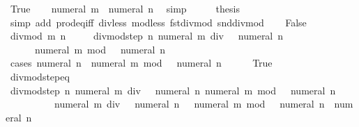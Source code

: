 \begin{isabellebody}
\ True\ \isamarkupfalse%
\ \isamarkupfalse%
\ {\isachardoublequoteopen}numeral\ m\ {\isacharless}{\kern0pt}\ numeral\ n{\isachardoublequoteclose}\ \isamarkupfalse%
\ simp\isanewline
\ \ \isamarkupfalse%
\ \isamarkupfalse%
\ {\isacharquery}{\kern0pt}thesis\isanewline
\ \ \ \ \isamarkupfalse%
\ {\isacharparenleft}{\kern0pt}simp\ add{\isacharcolon}{\kern0pt}\ prod{\isacharunderscore}{\kern0pt}eq{\isacharunderscore}{\kern0pt}iff\ div{\isacharunderscore}{\kern0pt}less\ mod{\isacharunderscore}{\kern0pt}less\ fst{\isacharunderscore}{\kern0pt}divmod\ snd{\isacharunderscore}{\kern0pt}divmod{\isacharparenright}{\kern0pt}\isanewline
{}\isamarkupfalse%
\isanewline
\ \ \isamarkupfalse%
\ False\isanewline
\ \ \isamarkupfalse%
\ {\isachardoublequoteopen}divmod\ m\ n\ {\isacharequal}{\kern0pt}\isanewline
\ \ \ \ divmod{\isacharunderscore}{\kern0pt}step\ n\ {\isacharparenleft}{\kern0pt}numeral\ m\ div\ {\isacharparenleft}{\kern0pt}{}\ {\isacharasterisk}{\kern0pt}\ numeral\ n{\isacharparenright}{\kern0pt}{\isacharcomma}{\kern0pt}\isanewline
\ \ \ \ \ \ numeral\ m\ mod\ {\isacharparenleft}{\kern0pt}{}\ {\isacharasterisk}{\kern0pt}\ numeral\ n{\isacharparenright}{\kern0pt}{\isacharparenright}{\kern0pt}{\isachardoublequoteclose}\isanewline
\ \ \isamarkupfalse%
\ {\isacharparenleft}{\kern0pt}cases\ {\isachardoublequoteopen}numeral\ n\ {\isasymle}\ numeral\ m\ mod\ {\isacharparenleft}{\kern0pt}{}\ {\isacharasterisk}{\kern0pt}\ numeral\ n{\isacharparenright}{\kern0pt}{\isachardoublequoteclose}{\isacharparenright}{\kern0pt}\isanewline
\ \ \ \ \isamarkupfalse%
\ True\isanewline
\ \ \ \ \isamarkupfalse%
\ divmod{\isacharunderscore}{\kern0pt}step{\isacharunderscore}{\kern0pt}eq\isanewline
\ \ \ \ \ \ \isamarkupfalse%
\ {\isachardoublequoteopen}divmod{\isacharunderscore}{\kern0pt}step\ n\ {\isacharparenleft}{\kern0pt}numeral\ m\ div\ {\isacharparenleft}{\kern0pt}{}\ {\isacharasterisk}{\kern0pt}\ numeral\ n{\isacharparenright}{\kern0pt}{\isacharcomma}{\kern0pt}\ numeral\ m\ mod\ {\isacharparenleft}{\kern0pt}{}\ {\isacharasterisk}{\kern0pt}\ numeral\ n{\isacharparenright}{\kern0pt}{\isacharparenright}{\kern0pt}\ {\isacharequal}{\kern0pt}\isanewline
\ \ \ \ \ \ \ \ {\isacharparenleft}{\kern0pt}{}\ {\isacharasterisk}{\kern0pt}\ {\isacharparenleft}{\kern0pt}numeral\ m\ div\ {\isacharparenleft}{\kern0pt}{}\ {\isacharasterisk}{\kern0pt}\ numeral\ n{\isacharparenright}{\kern0pt}{\isacharparenright}{\kern0pt}\ {\isacharplus}{\kern0pt}\ {}{\isacharcomma}{\kern0pt}\ numeral\ m\ mod\ {\isacharparenleft}{\kern0pt}{}\ {\isacharasterisk}{\kern0pt}\ numeral\ n{\isacharparenright}{\kern0pt}\ {\isacharminus}{\kern0pt}\ numeral\ n{\isacharparenright}{\kern0pt}{\isachardoublequoteclose}\isanewline

\end{isabellebody}
